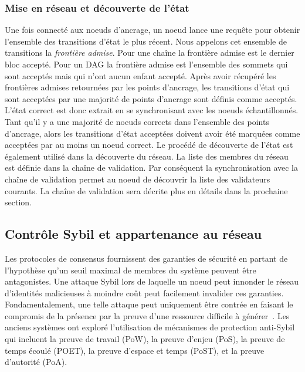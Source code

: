 \documentclass[runningheads]{llncs}
\begin{document}
\subsubsection{Mise en réseau et découverte de l'état}
Une fois connecté aux noeuds d'ancrage, un noeud lance une requête pour obtenir l'ensemble des transitions d'état
le plus récent. Nous appelons cet ensemble de transitions la \emph{frontière admise}. Pour une chaîne la frontière
admise est le dernier bloc accepté. Pour un DAG la frontière admise est l'ensemble des sommets qui sont acceptés mais
qui n'ont aucun enfant accepté. Après avoir récupéré les frontières admises retournées par les points d'ancrage, les
transitions d'état qui sont acceptées par une majorité de points d'ancrage sont définis comme acceptés. L'état correct
est donc extrait en se synchronisant avec les noeuds échantillonnés. Tant qu'il y a une majorité de noeuds corrects
dans l'ensemble des points d'ancrage, alors les transitions d'état acceptées doivent avoir été marquées comme
acceptées par au moins un noeud correct. Le procédé de découverte de l'état est également utilisé dans la découverte
du réseau. La liste des membres du réseau est définie dans la chaîne de validation. Par conséquent la synchronisation
avec la chaîne de validation permet au noeud de découvrir la liste des validateurs courants. La chaîne de validation
sera décrite plus en détails dans la prochaine section.

\subsection{Contrôle Sybil et appartenance au réseau}
Les protocoles de consensus fournissent des garanties de sécurité en partant de l'hypothèse qu'un seuil maximal de
membres du système peuvent être antagonistes. Une attaque Sybil lors de laquelle un noeud peut innonder le réseau
d'identités malicieuses à moindre coût peut facilement invalider ces garanties. Fondamentalement, une telle attaque peut
uniquement être contrée en faisant le compromis de la présence par la preuve d'une ressource difficile à
générer~\cite{douceur2002sybil}. Les anciens systèmes ont exploré l'utilisation de mécanismes de protection anti-Sybil
qui incluent la preuve de travail (PoW), la preuve d'enjeu (PoS), la preuve de temps écoulé (POET), la preuve d'espace
et temps (PoST), et la preuve d'autorité (PoA).
\end{document}
